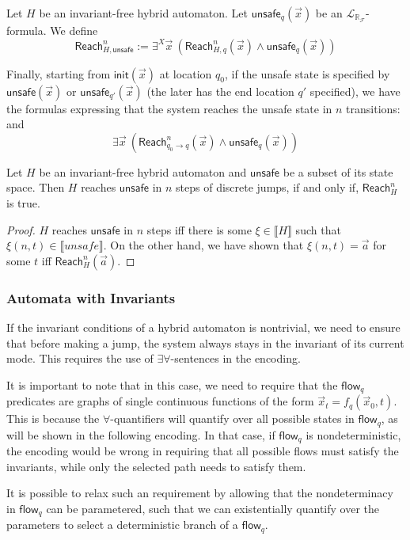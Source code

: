 \documentclass[envcountsect]{llncs}
\newcommand{\flow}{\mathsf{flow}}
\newcommand{\init}{\mathsf{init}}
\newcommand{\reach}{\mathsf{Reach}}
\newcommand{\unsafe}{\mathsf{unsafe}}
\newcommand{\lrf}{\mathcal{L}_{\mathbb{R}_{\mathcal{F}}}}
\begin{document}
\begin{definition}[$\reach^n_{H,\unsafe}$] Let $H$ be an invariant-free hybrid
automaton. Let $\unsafe_q(\vec x)$ be an $\lrf$-formula. We define
$$\reach^n_{H,\unsafe}:= \exists^X \vec x \ (\reach^n_{H,q}(\vec x)\wedge
\unsafe_q(\vec x))$$
\end{definition}

Finally, starting from $\init(\vec x)$ at location $q_0$, if the unsafe state
is specified by $\unsafe(\vec x)$ or $\unsafe_{q'}(\vec x)$ (the later has the
end location $q'$ specified), we have the formulas expressing that the system
reaches the unsafe state in $n$ transitions:
and
$$\exists \vec x\ (\reach^n_{q_0\rightarrow q}(\vec x)\wedge \unsafe_q(\vec x))$$

\begin{corollary}
Let $H$ be an invariant-free hybrid automaton and $\unsafe$ be a subset of its
state space. Then $H$ reaches $\unsafe$ in $n$ steps of discrete jumps, if and
only if, $\reach^n_{H}$ is true. 
\end{corollary}

\begin{proof}
$H$ reaches $\unsafe$ in $n$ steps iff there is some $\xi\in \llbracket
H\rrbracket$ such that $\xi(n, t)\in \llbracket unsafe\rrbracket$. On the other
hand, we have shown that $\xi(n, t) = \vec a$ for some $t$ iff $\reach_H^n(\vec
a)$.
\end{proof}


\subsubsection{Automata with Invariants}\label{auto_inv}

If the invariant conditions of a hybrid automaton is nontrivial, we need to
ensure that before making a jump, the system always stays in the invariant of
its current mode. This requires the use of $\exists\forall$-sentences in the
encoding. 

\begin{remark}
It is important to note that in this case, we need to require that the
$\flow_q$ predicates are graphs of single continuous functions of the form $\vec
x_t = f_q(\vec x_0, t)$. This is because the $\forall$-quantifiers will quantify
over all possible states in $\flow_q$, as will be shown in the following
encoding. In that case, if $\flow_q$ is nondeterministic, the encoding would be
wrong in requiring that all possible flows must satisfy the invariants, while
only the selected path needs to satisfy them. 

It is possible to relax such an requirement by allowing that the nondeterminacy
in $\flow_q$ can be parametered, such that we can existentially quantify over
the parameters to select a deterministic branch of a $\flow_q$. 
\end{remark}
\end{document}
